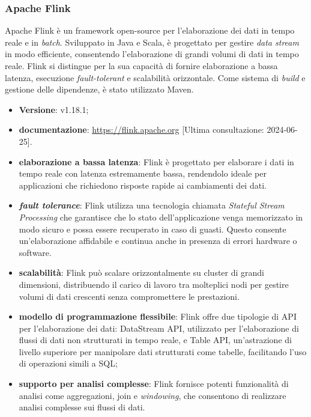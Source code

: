 \subsubsection{Apache Flink} \label{sec:flink}
Apache Flink è un framework open-source per l'elaborazione dei dati in tempo reale e in \textit{batch}.
Sviluppato in Java e Scala, è progettato per gestire \textit{data stream} in modo efficiente, consentendo l'elaborazione di grandi volumi di dati in tempo reale.
Flink si distingue per la sua capacità di fornire elaborazione a bassa latenza, esecuzione \textit{fault-tolerant} e scalabilità orizzontale.
Come sistema di \textit{build} e gestione delle dipendenze, è stato utilizzato Maven.

\begin{itemize}
	\item \textbf{Versione}: v1.18.1;
	\item \textbf{documentazione}: \url{https://flink.apache.org} [Ultima consultazione: 2024-06-25].
\end{itemize}

\begin{itemize}
	\item \textbf{elaborazione a bassa latenza}: Flink è progettato per elaborare i dati in tempo reale con latenza estremamente bassa, rendendolo ideale per applicazioni che richiedono risposte rapide ai cambiamenti dei dati.
	\item \textbf{\textit{fault tolerance}}: Flink utilizza una tecnologia chiamata \textit{Stateful Stream Processing} che garantisce che lo stato dell'applicazione venga memorizzato in modo sicuro e possa essere recuperato in caso di guasti. Questo consente un'elaborazione affidabile e continua anche in presenza di errori hardware o software.
	\item \textbf{scalabilità}: Flink può scalare orizzontalmente su cluster di grandi dimensioni, distribuendo il carico di lavoro tra molteplici nodi per gestire volumi di dati crescenti senza compromettere le prestazioni.
	\item \textbf{modello di programmazione flessibile}: Flink offre due tipologie di API per l'elaborazione dei dati: DataStream API, utilizzato per l'elaborazione di flussi di dati non strutturati in tempo reale, e Table API, un'astrazione di livello superiore per manipolare dati strutturati come tabelle, facilitando l'uso di operazioni simili a SQL;
	\item \textbf{supporto per analisi complesse}: Flink fornisce potenti funzionalità di analisi come aggregazioni, join e \textit{windowing}, che consentono di realizzare analisi complesse sui flussi di dati.
\end{itemize}

